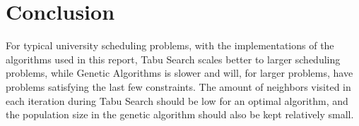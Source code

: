 \documentclass[titlepage,a4paper]{article}
\begin{document}
\pagebreak
\section{Conclusion}
For typical university scheduling problems, with the implementations of the algorithms used in this report, Tabu Search scales better to larger scheduling problems, while Genetic Algorithms is slower and will, for larger problems, have problems satisfying the last few constraints. The amount of neighbors visited in each iteration during Tabu Search should be low for an optimal algorithm, and the population size in the genetic algorithm should also be kept relatively small.

\pagebreak



\end{document}
